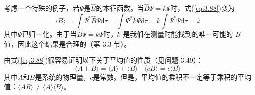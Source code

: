 	考虑一个特殊的例子，若$\Psi$是$\hat{B}$的本征函数。当$\hat{B}\Psi = k\Psi$时，式(\ref{eq:3.88})变为
	\begin{equation*}
		\langle B \rangle = \int \Psi^{\ast}\hat{B}\Psi\mathrm{d}\tau = \int \Psi^{\ast}k\Psi\mathrm{d}\tau = k \int \Psi^{\ast}\Psi\mathrm{d}\tau = k
	\end{equation*}
	其中$\Psi$已归一化。由于当$\hat{B}\Psi = k\Psi$时，$k$ 是我们在测量时能找到的唯一可能的 $B$ 值，因此这个结果是合理的（第 3.3 节）。

	由式(\ref{eq:3.88})很容易证明以下关于平均值的性质（见问题 3.49）：
	\begin{equation}
		\boxed{
			\langle A + B \rangle = \langle A \rangle + \langle B \rangle
		}
		\quad
		\boxed{
			\langle cB \rangle = c\langle B \rangle
		}
		\label{eq:3.90}
	\end{equation}
	其中$A$和$B$是系统的物理量，$c$是常数。但是，平均值的乘积不一定等于乘积的平均值：$\langle AB \rangle \neq \langle A \rangle\langle B \rangle$。


